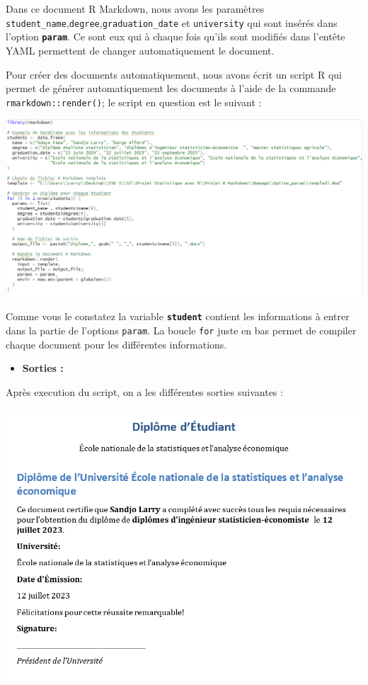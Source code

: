 \documentclass[
  12pt,
]{article}
\providecommand{\tightlist}{%
  \setlength{\itemsep}{0pt}\setlength{\parskip}{0pt}}
\begin{document}
Dans ce document R Markdown, nous avons les paramètres
\texttt{student\_name},\texttt{degree},\texttt{graduation\_date} et
\texttt{university} qui sont insérés dans l'option
\textbf{\texttt{param}}. Ce sont eux qui à chaque fois qu'ils sont
modifiés dans l'entête YAML permettent de changer automatiquement le
document.

Pour créer des documents automatiquement, nous avons écrit un script R
qui permet de générer automatiquement les documents à l'aide de la
commande \texttt{rmarkdown::render()}; le script en question est le
suivant :

\begin{center}\includegraphics[width=1\linewidth,height=1\textheight]{../Document_Rmarkdown/Images/essai} \end{center}

Comme vous le constatez la variable \textbf{\texttt{student}} contient
les informations à entrer dans la partie de l'options \texttt{param}. La
boucle \texttt{for} juste en bas permet de compiler chaque document pour
les différentes informations.

\begin{itemize}
\tightlist
\item
  \textbf{Sorties :}
\end{itemize}

Après execution du script, on a les différentes sorties suivantes :

\begin{center}\includegraphics[width=1\linewidth,height=1\textheight]{../Document_Rmarkdown/Images/Sortie_param1} \end{center}
\end{document}

